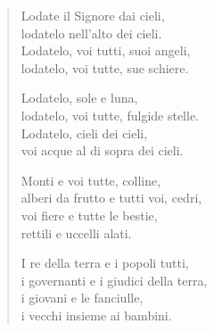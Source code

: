 \documentclass[11pt]{book}
\begin{document}
\nobreak
\begin{verse}
Lodate il Signore dai cieli,\\
lodatelo nell'alto dei cieli.\\
Lodatelo, voi tutti, suoi angeli,\\
lodatelo, voi tutte, sue schiere.\\
\rispostasalmo

Lodatelo, sole e luna,\\
lodatelo, voi tutte, fulgide stelle.\\
Lodatelo, cieli dei cieli,\\
voi acque al di sopra dei cieli.\\
\rispostasalmo

Monti e voi tutte, colline,\\
alberi da frutto e tutti voi, cedri,\\
voi fiere e tutte le bestie,\\
rettili e uccelli alati.\\
\rispostasalmo


I re della terra e i popoli tutti,\\
i governanti e i giudici della terra,\\
i giovani e le fanciulle,\\
i vecchi insieme ai bambini.\\
\rispostasalmo
\end{verse}
\newpage%
\end{document}
